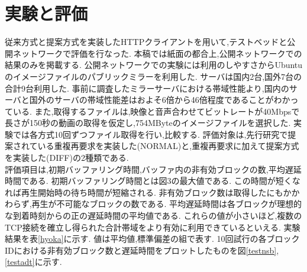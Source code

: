 \documentclass{ltjsarticle}
\begin{document}
\section{実験と評価}
\vspace{-2.75mm}
従来方式と提案方式を実装したHTTPクライアントを用いて,テストベッドと公開ネットワークで評価を行なった.
本稿では紙面の都合上,公開ネットワークでの結果のみを掲載する.
公開ネットワークでの実験には利用のしやすさからUbuntuのイメージファイルのパブリックミラーを利用した.
サーバは国内2台,国外7台の合計9台利用した.
事前に調査したミラーサーバにおける帯域性能より,国内のサーバと国外のサーバの帯域性能差はおよそ6倍から46倍程度であることがわかっている.
また,取得するファイルは,映像と音声合わせてビットレートが40Mbpsで長さが150秒の動画の取得を仮定し,754MByteのイメージファイルを選択した.
実験では各方式10回ずつファイル取得を行い,比較する.
評価対象は,先行研究で提案されている重複再要求を実装した(NORMAL)と,重複再要求に加えて提案方式を実装した(DIFF)の2種類である.
\\
\hspace{3.5mm}評価項目は,初期バッファリング時間,バッファ内の非有効ブロックの数,平均遅延時間である.
初期バッファリング時間とは図3の最大値である.
この時間が短くなれば再生開始時の待ち時間が短縮される.
非有効ブロック数は取得したにもかかわらず,再生が不可能なブロックの数である.
平均遅延時間は各ブロックが理想的な到着時刻からの正の遅延時間の平均値である.
これらの値が小さいほど,複数のTCP接続を確立し得られた合計帯域をより有効に利用できているといえる.
実験結果を表\ref{hyoka}に示す.
値は平均値,標準偏差の組で表す.
10回試行の各ブロックIDにおける非有効ブロック数と遅延時間をプロットしたものを図\ref{testnsb},\ref{testadt}に示す.
\vspace{-7.5mm}
\begin{table}[htb]
	\begin{center}
		\caption{各評価項目の平均値，標準偏差}
		\vspace{-0.5mm}
		\label{hyoka}
	\end{center}
\end{table}
\vspace{-10mm}
\end{document}
